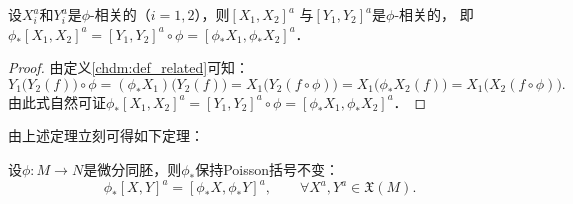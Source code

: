 
\begin{theorem}\label{chdm:thm_push-Poisson-related}
    设$X_i^a$和$Y_i^a$是$\phi$-相关的（$i=1,2$），则$[X_1,X_2]^a$
    与$[Y_1,Y_2]^a$是$\phi$-相关的，
    即$\phi_{*} [X_1,X_2]^a = [Y_1,Y_2]^a\circ \phi =\left[\phi_{*}X_1,\phi_{*}X_2\right]^a$．
\end{theorem}
\begin{proof}
    由定义\ref{chdm:def_related}可知：
    \begin{equation*}
        Y_1\bigl( Y_2 (f)\bigr)\circ \phi = (\phi_* X_1 )\bigl( Y_2 (f)\bigr)
        =X_1\bigl( Y_2 (f\circ \phi)\bigr)  =X_1\bigl( \phi_{*} X_2 (f)\bigr) = X_1\bigl( X_2 (f\circ \phi)\bigr) .
    \end{equation*}
    由此式自然可证$\phi_{*} [X_1,X_2]^a = [Y_1,Y_2]^a\circ \phi =\left[\phi_{*}X_1,\phi_{*}X_2\right]^a$．
\end{proof}

由上述定理立刻可得如下定理：
\begin{theorem}\label{chdm:thm_push-Poisson}
    设$\phi:M\to N$是微分同胚，则$\phi_{*}$保持Poisson括号不变：
    \begin{equation}\label{chdm:eqn_push-Poisson}
        \phi_{*} [X,Y]^a = \left[\phi_{*}X,\phi_{*}Y\right]^a, \qquad
        \forall X^a, Y^a \in \mathfrak{X}(M) .
    \end{equation}
\end{theorem}


